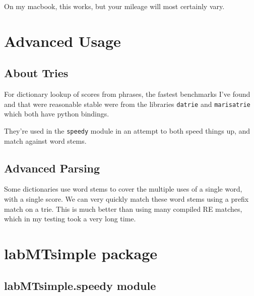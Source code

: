 On my macbook, this works, but your mileage will most certainly vary.


\section{Advanced Usage}
\label{advanced::doc}\label{advanced:advanced-usage}

\subsection{About Tries}
\label{advanced:about-tries}
For dictionary lookup of scores from phrases, the fastest benchmarks I've found and that were reasonable stable were from the libraries \lstinline{datrie} and \lstinline{marisatrie} which both have python bindings.

They're used in the \lstinline{speedy} module in an attempt to both speed things up, and match against word stems.

\subsection{Advanced Parsing}
\label{advanced:advanced-parsing}
Some dictionaries use word stems to cover the multiple uses of a single word, with a single score.
We can very quickly match these word stems using a prefix match on a trie.
This is much better than using many compiled RE matches, which in my testing took a very long time.


\section{labMTsimple package}
\label{labMTsimple:labmtsimple-package}\label{labMTsimple::doc}

\subsection{labMTsimple.speedy module}
\label{labMTsimple:labmtsimple-speedy-module}\label{labMTsimple:module-labMTsimple.speedy}


